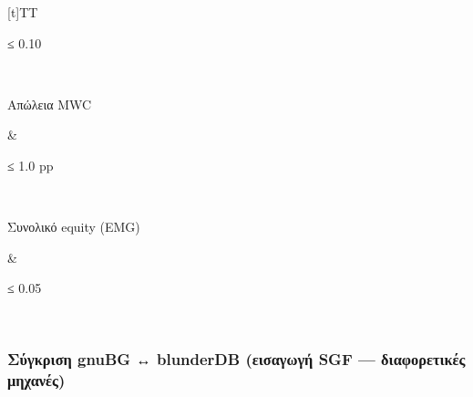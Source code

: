 \documentclass[letterpaper,10pt,greek]{sphinxmanual}
\begin{document}
\begin{savenotes}
\begin{tabulary}{\linewidth}[t]{TT}
\begin{varwidth}[t]{}
\sphinxAtStartPar
≤ 0.10
\sphinxbeforeendvarwidth
\end{varwidth}%
\\
\sphinxhline\begin{varwidth}[t]{}
\sphinxAtStartPar
Απώλεια MWC
\sphinxbeforeendvarwidth
\end{varwidth}%
&\begin{varwidth}[t]{}
\sphinxAtStartPar
≤ 1.0 pp
\sphinxbeforeendvarwidth
\end{varwidth}%
\\
\sphinxhline\begin{varwidth}[t]{}
\sphinxAtStartPar
Συνολικό equity (EMG)
\sphinxbeforeendvarwidth
\end{varwidth}%
&\begin{varwidth}[t]{}
\sphinxAtStartPar
≤ 0.05
\sphinxbeforeendvarwidth
\end{varwidth}%
\\
\sphinxbottomrule
\end{tabulary}
\sphinxtableafterendhook\par
\sphinxattableend\end{savenotes}


\subsubsection{Σύγκριση gnuBG ↔ blunderDB (εισαγωγή SGF — διαφορετικές μηχανές)}
\label{\detokenize{stats_parity:comparaison-gnubg-blunderdb-import-sgf-moteurs-differents}}
\end{document}
